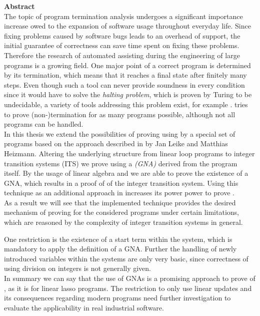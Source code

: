 {\bf\Large Abstract} \\ [1em] 

The topic of program termination analysis undergoes a significant importance increase owed to the expansion of software usage throughout everyday life. Since fixing problems caused by software bugs leads to an overhead of support, the initial guarantee of correctness can save time spent on fixing these problems. Therefore the research of automated assisting during the engineering of large programs is a growing field.
One major point of a correct program is determined by its termination, which means that it reaches a final state after finitely many steps. Even though such a tool can never provide soundness in every condition since it would have to solve the \textit{halting problem}, which is proven by Turing to be undecidable, a variety of tools addressing this problem exist, for example \aprove. \aprove tries to prove (non-)termination for as many programs possible, although not all programs can be handled.\newline \\
In this thesis we extend the possibilities of proving \nonterm using \aprove by a special set of programs based on the approach described in \cite{leike2014geometric} by Jan Leike and Matthias Heizmann. Altering the underlying structure from linear loop programs to integer transition systems (ITS) we prove \nonterm using a \textit{\gna (GNA)} derived from the program itself. By the usage of linear algebra and \solver we are able to prove the existence of a GNA, which results in a proof of \nonterm of the integer transition system. Using this technique as an additional approach in \aprove increases its power power to prove \nonterm. 
\\
As a result we will see that the implemented technique provides the desired mechanism of proving \nonterm for the considered programs under certain limitations, which are reasoned by the complexity of integer transition systems in general.

 One restriction is the existence of a start term within the system, which is mandatory to apply the definition of a GNA. Further the handling of newly introduced variables within the systems are only very basic, since correctness of using division on integers is not generally given. \newline
\\
In summary we can say that the use of GNAs is a promising approach to prove \nonterm of \itss, as it is for linear lasso programs. The restriction to only use linear updates and its consequences regarding modern programs need further investigation to evaluate the applicability in real industrial software.
